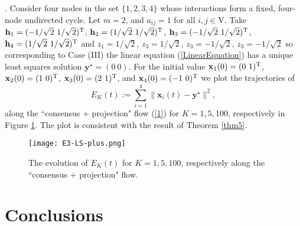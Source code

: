\documentclass[a4paper, 11pt]{article}
\def\T{^{\rm\tiny T}}
\begin{document}
\medskip


. Consider four nodes in the set $\{1,2,3,4\}$ whose interactions form a fixed, four-node undirected cycle.  Let $m=2$,  and $a_{ij}=1$ for all $i,j\in\mathrm{V}$.   Take $\mathbf{h}_1 =(-1/\sqrt{2}\ 1/\sqrt{2})\T$, $\mathbf{h}_2 =(1/\sqrt{2}\ 1/\sqrt{2})\T$, $\mathbf{h}_3=(-1/\sqrt{2}\ 1/\sqrt{2})\T $, $\mathbf{h}_4=(1/\sqrt{2}\ 1/\sqrt{2})\T $ and $z_1=1/\sqrt{2}$,   $z_3=1/\sqrt{2}$, $z_3=-1/\sqrt{2}$, $z_3=-1/\sqrt{2}$ so corresponding to Case (III) the linear equation (\ref{LinearEquation}) has  a unique least squares solution $\mathbf{y}^\star=(0\ 0)$.
 For the initial value $\mathbf{x}_1(0)=(0\ 1)\T$, $\mathbf{x}_2(0)=(1\ 0)\T$, $\mathbf{x}_3(0)=(2\ 1)\T$, and $\mathbf{x}_4(0)=(-1\ 0)\T$ we plot the trajectories of $$
 E_K(t):=\sum_{i=1}^4\Big\|\mathbf{x}_i(t)-\mathbf{y}^\star\Big\|^2,
 $$
along  the ``consensus + projection" flow (\ref{1}) for $K=1, 5, 100$, respectively in Figure \ref{fig:fig3}.   The plot is consistent with the result of Theorem \ref{thm5}.

\begin{figure}
\centering
\texttt{[image: E3-LS-plus.png]}
\caption{The evolution of $ E_K(t)$  for $K=1,5,100$, respectively along the ``consensus + projection" flow.}
\label{fig:fig3}
\end{figure}








\section{Conclusions}\label{Sec:conclusions}
\end{document}
